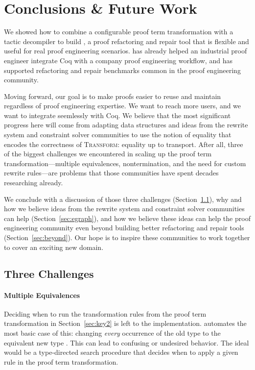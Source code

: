\section{Conclusions \& Future Work}
\label{sec:discussion}

We showed how to combine a configurable proof term transformation with a tactic decompiler to build \toolname,
a proof refactoring and repair tool that is flexible and useful for real proof engineering scenarios.
\toolname has already helped an industrial proof engineer integrate Coq with a company proof engineering workflow,
and has supported refactoring and repair benchmarks common in the proof engineering community.

Moving forward, our goal is to make proofs easier to reuse and maintain regardless of proof engineering expertise.
We want to reach more users, and we want \toolname to integrate seemlessly with Coq.
We believe that the most significant progress here will come from adapting data structures and ideas
from the rewrite system and constraint solver communities to use the notion of equality that encodes the correctness of \textsc{Transform}: equality up 
to transport. After all, three of the biggest challenges we encountered in scaling up the \toolname proof term transformation---multiple equivalences, nontermination, and the need for custom rewrite rules---are problems that those communities have spent decades researching already.%

We conclude with a discussion of those three challenges (Section~\ref{sec:problems}), why and how we believe ideas from the rewrite system and constraint
solver communities can help (Section~\ref{sec:egraph}), and how we believe these ideas can help the proof engineering community
even beyond building better refactoring and repair tools (Section~\ref{sec:beyond}).
Our hope is to inspire these communities to work together to cover an exciting new domain.

\subsection{Three Challenges}
\label{sec:problems}

\paragraph{Multiple Equivalences}

Deciding when to run the transformation rules from the proof term transformation in Section~\ref{sec:key2} is left to the implementation.
\toolname automates the most basic case of this: changing \textit{every} occurrence of the old type \A to the equivalent new type \B.
This can lead to confusing or undesired behavior.
The ideal would be a type-directed search procedure that decides when to apply a given rule in the proof term transformation.


